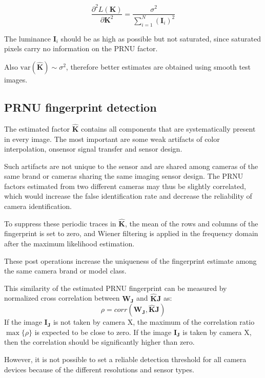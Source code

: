 \documentclass[a4paper, 11pt]{article}
\begin{document}
\begin{equation}
\dfrac{ \partial^2 L(\mathbf{K})}{\partial \mathbf{K}^2} = \dfrac{\sigma^2}{\sum\limits_{i=1}^{N} \left( \mathbf{I}_i \right) ^2}
\end{equation}

The luminance $\mathbf{I}_i$ should be as high as possible but not saturated, since saturated pixels carry no information on the PRNU factor.

Also $\text{var}(\mathbf{\hat{K}}) \sim \sigma^2$, therefore better estimates are obtained using smooth test images.

\subsection*{PRNU fingerprint detection}

The estimated factor $\mathbf{\hat{K}}$ contains all components that are systematically present in every image. The most important are some weak artifacts of color interpolation, onsensor signal transfer and sensor design.

Such artifacts are not unique to the sensor and are shared among cameras of the same brand or cameras sharing the same imaging sensor design. The PRNU factors estimated from two different cameras may thus be slightly correlated, which would increase the false identification rate and decrease the reliability of camera identification.

To suppress these periodic traces in $\mathbf{\hat{K}}$, the mean of the rows and columns of the fingerprint is set to zero, and Wiener filtering is applied in the frequency domain after the maximum likelihood estimation.

These post operations increase the uniqueness of the fingerprint estimate among the same camera brand or model class.

This similarity of the estimated PRNU fingerprint can be measured by normalized cross correlation between $\mathbf{W_J}$ and $\mathbf{\hat{K}J}$ as:
\begin{equation}
\rho = corr \left( \mathbf{W_J}, \mathbf{\hat{K}J} \right)
\end{equation}
If the image $\mathbf{I_J}$ is not taken by camera X, the maximum of the correlation ratio $\max\{\rho\}$ is expected to be close to zero. If the image $\mathbf{I_J}$ is taken by camera X, then the correlation should be significantly higher than zero.

However, it is not possible to set a reliable detection threshold for all camera devices because of the different resolutions and sensor types.
\end{document}

